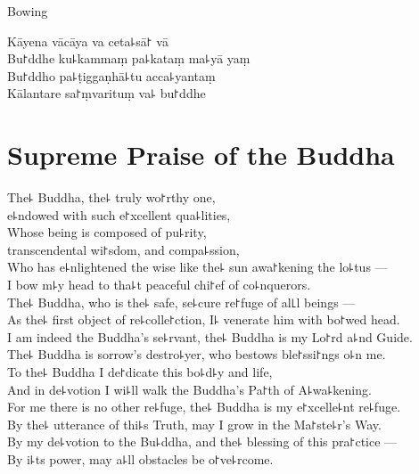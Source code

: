 \begin{instruction}
  Bowing
\end{instruction}

Kāyena vācāya va ceta꜕sā꜓ vā\\
Bu꜓ddhe ku꜕kammaṃ pa꜕kataṃ ma꜕yā yaṃ\\
Bu꜓ddho pa꜕ṭiggaṇhā꜕tu acca꜕yantaṃ\\
Kālantare sa꜓ṃvarituṃ va꜕ bu꜓ddhe

\clearpage

\chEnglish
\chapter{Supreme Praise of the Buddha}%

\begin{leader}
\end{leader}

The꜕ Buddha, the꜕ truly wo꜓rthy one,\\
\vin e꜕ndowed with such e꜓xcellent qua꜕lities,\\
Whose being is composed of pu꜕rity,\\
\vin transcendental wi꜓sdom, and compa꜕ssion,\\
Who has e꜕nlightened the wise like the꜕ sun awa꜓kening the lo꜕tus ---\\
I bow m꜕y head to tha꜕t peaceful chi꜓ef of co꜕nquerors.\\
The꜕ Buddha, who is the꜕ safe, se꜕cure re꜓fuge of al꜖l beings ---\\
As the꜕ first object of re꜕colle꜓ction, I꜕ venerate him with bo꜓wed head.\\
I am indeed the Buddha's se꜕rvant, the꜕ Buddha is my Lo꜓rd a꜕nd Guide.\\
The꜕ Buddha is sorrow's destro꜕yer, who bestows ble꜓ssi꜓ngs o꜕n me.\\
To the꜕ Buddha I de꜓dicate this bo꜕d꜕y and life,\\
And in de꜕votion I wi꜕ll walk the Buddha's Pa꜓th of A꜕wa꜕kening.\\
For me there is no other re꜕fuge, the꜕ Buddha is my e꜓xcelle꜕nt re꜕fuge.\\
By the꜕ utterance of thi꜕s Truth, may I grow in the Ma꜓ste꜕r's Way.\\
By my de꜕votion to the Bu꜕ddha, and the꜕ blessing of this pra꜓ctice ---\\
By i꜕ts power, may a꜕ll obstacles be o꜓ve꜕rcome.

